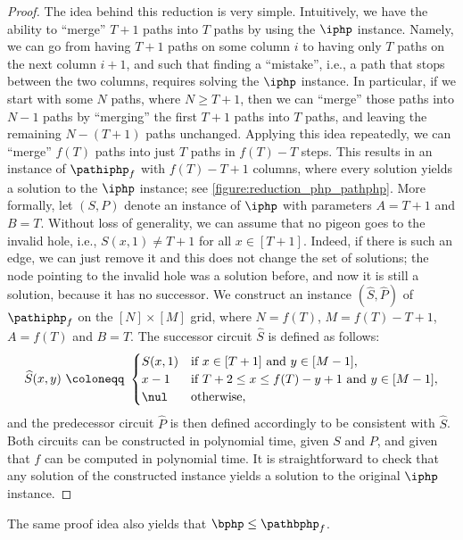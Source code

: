 \begin{proof}
The idea behind this reduction is very simple. Intuitively, we have the ability to ``merge'' $T+1$ paths into $T$ paths by using the $\iphp$ instance. Namely, we can go from having $T+1$ paths on some column $i$ to having only $T$ paths on the next column $i+1$, and such that finding a ``mistake'', i.e., a path that stops between the two columns, requires solving the $\iphp$ instance. In particular, if we start with some $N$ paths, where $N \geq T+1$, then we can ``merge'' those paths into $N-1$ paths by ``merging'' the first $T+1$ paths into $T$ paths, and leaving the remaining $N-(T+1)$ paths unchanged. Applying this idea repeatedly, we can ``merge'' $f(T)$ paths into just $T$ paths in $f(T)-T$ steps. This results in an instance of $\pathiphp_f$ with $f(T)-T+1$ columns, where every solution yields a solution to the $\iphp$ instance; see \cref{figure:reduction_php_pathphp}. More formally, let $(S,P)$ denote an instance of $\iphp$ with parameters $A=T+1$ and $B=T$. Without loss of generality, we can assume that no pigeon goes to the invalid hole, i.e., $S(x,1) \neq T+1$ for all $x \in [T+1]$. Indeed, if there is such an edge, we can just remove it and this does not change the set of solutions; the node pointing to the invalid hole was a solution before, and now it is still a solution, because it has no successor. We construct an instance $(\widehat{S}, \widehat{P})$ of $\pathiphp_f$ on the $[N] \times [M]$ grid, where $N=f(T)$, $M=f(T)-T+1$, $A=f(T)$ and $B=T$. The successor circuit $\widehat{S}$ is defined as follows:
\begin{equation*}
    \widehat{S}(x,y)
    ~\coloneqq~
    \begin{cases}
    S(x,1) & \text{if } x \in [T+1] \text{ and } y \in [M-1],\\
    x-1 & \text{if } T+2 \leq x \leq f(T) - y + 1 \text{ and } y \in [M-1],\\
    \nul & \text{otherwise},
    \end{cases}
\end{equation*}
and the predecessor circuit $\widehat{P}$ is then defined accordingly to be consistent with $\widehat{S}$. Both circuits can be constructed in polynomial time, given $S$ and $P$, and given that $f$ can be computed in polynomial time. It is straightforward to check that any solution of the constructed instance yields a solution to the original $\iphp$ instance.
\end{proof}

The same proof idea also yields that $\bphp\leq \pathbphp_f$.

